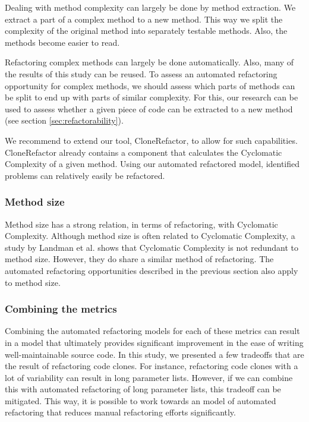 Dealing with method complexity can largely be done by method extraction. We extract a part of a complex method to a new method. This way we split the complexity of the original method into separately testable methods. Also, the methods become easier to read.

Refactoring complex methods can largely be done automatically. Also, many of the results of this study can be reused. To assess an automated refactoring opportunity for complex methods, we should assess which parts of methods can be split to end up with parts of similar complexity. For this, our research can be used to assess whether a given piece of code can be extracted to a new method (see section \ref{sec:refactorability}).

We recommend to extend our tool, CloneRefactor, to allow for such capabilities. CloneRefactor already contains a component that calculates the Cyclomatic Complexity of a given method. Using our automated refactored model, identified problems can relatively easily be refactored.

\subsubsection{Method size}
Method size has a strong relation, in terms of refactoring, with Cyclomatic Complexity. Although method size is often related to Cyclomatic Complexity, a study by Landman et al. \cite{landman2016empirical} shows that Cyclomatic Complexity is not redundant to method size. However, they do share a similar method of refactoring. The automated refactoring opportunities described in the previous section also apply to method size.

\subsubsection{Combining the metrics}
Combining the automated refactoring models for each of these metrics can result in a model that ultimately provides significant improvement in the ease of writing well-maintainable source code. In this study, we presented a few tradeoffs that are the result of refactoring code clones. For instance, refactoring code clones with a lot of variability can result in long parameter lists. However, if we can combine this with automated refactoring of long parameter lists, this tradeoff can be mitigated. This way, it is possible to work towards an model of automated refactoring that reduces manual refactoring efforts significantly.

